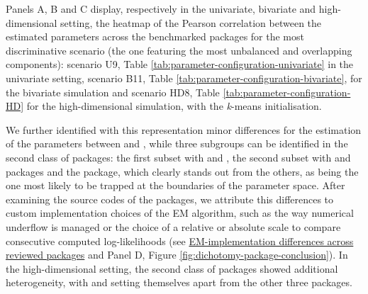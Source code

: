 Panels A, B and C display, respectively in the univariate, bivariate and high-dimensional setting, the heatmap of the Pearson correlation between the estimated parameters across the benchmarked packages for the most discriminative scenario (the one featuring the most unbalanced and overlapping components): scenario U9, Table \ref{tab:parameter-configuration-univariate} in the univariate setting, scenario B11, Table \ref{tab:parameter-configuration-bivariate}, for the bivariate simulation and scenario HD8, Table \ref{tab:parameter-configuration-HD} for the high-dimensional simulation, with the \emph{k}-means initialisation.

We further identified with this representation minor differences for the estimation of the parameters between  and , while three subgroups can be identified in the second class of packages: the first subset with  and , the second subset with  and  packages and the  package, which clearly stands out from the others, as being the one most likely to be trapped at the boundaries of the parameter space. After examining the source codes of the packages, we attribute this differences to custom implementation choices of the EM algorithm, such as the way numerical underflow is managed or the choice of a relative or absolute scale to compare consecutive computed log-likelihoods (see \protect\hyperlink{em-implementation-differences-across-reviewed-packages}{EM-implementation differences across reviewed packages} and Panel D, Figure \ref{fig:dichotomy-package-conclusion}). \color{green} In the high-dimensional setting, the second class of packages showed additional heterogeneity, with  and  setting themselves apart from the other three packages.\color{black}

